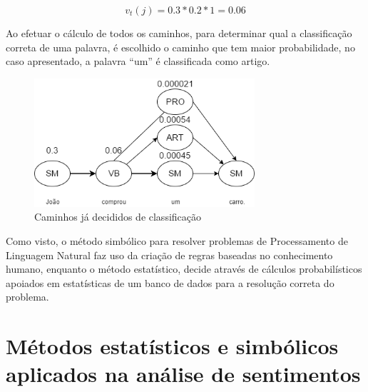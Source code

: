 \[ v_t(j) = 0.3 * 0.2 * 1 = 0.06 \] 

Ao efetuar o cálculo de todos os caminhos, para determinar qual a classificação
correta de uma palavra, é escolhido o caminho que tem maior probabilidade, no
caso apresentado, a palavra ``um'' é classificada como artigo.

\begin{figure}[htbp]
 \centering
 \includegraphics[height=180px]{imagens/markov2.png}
 \caption{Caminhos já decididos de classificação}
 \label{fig:markov2}
\end{figure}

Como visto, o método simbólico para resolver problemas de Processamento de
Linguagem Natural faz uso da criação de regras baseadas no conhecimento humano,
enquanto o método estatístico, decide através de cálculos probabilísticos
apoiados em estatísticas de um banco de dados para a resolução correta do
problema.


% 
% 
% 

\section{Métodos estatísticos e simbólicos aplicados na análise de sentimentos}
\label{cap:Classificadores}


